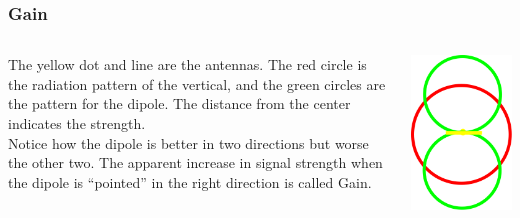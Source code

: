 \documentclass[10pt, handout]{beamer}
\begin{document}
\begin{frame}
\frametitle{Gain}
\begin{columns}
\begin{column}{.5\textwidth}
The yellow dot and line are the antennas. The red circle is the radiation pattern of the vertical, and the green circles are the pattern for the dipole. The distance from the center indicates the strength.\\
Notice how the dipole is better in two directions but worse the other two. The apparent increase in signal strength when the dipole is ``pointed'' in the right direction is called Gain.
\end{column}
\begin{column}{.5\textwidth}
\includegraphics[width=\textwidth]{vertvsdipole.png}
\end{column}
\end{columns}
\end{frame}
\end{document}

